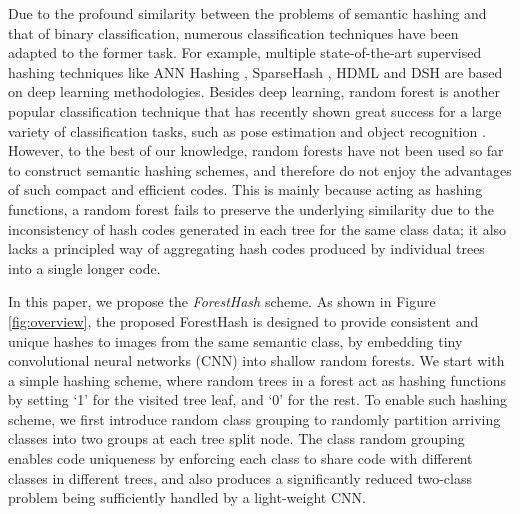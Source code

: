 \documentclass[runningheads]{llncs}
\begin{document}
Due to the profound similarity between the problems of semantic hashing and that
of binary classification, numerous classification techniques have been adapted
to the former task.  For example, multiple state-of-the-art supervised hashing
techniques like ANN Hashing \cite{MM-NN}, SparseHash \cite{sparsehash}, HDML
\cite{HDML} and DSH \cite{STH} are based on deep learning methodologies.
Besides deep learning, random forest \cite{RF2001, RFBook} is another popular
classification technique that has recently shown great success for a large
variety of classification tasks, such as pose estimation \cite{RF-pose} and
object recognition \cite{RF-obj}.  However, to the best of our knowledge, random
forests have not been used so far to construct semantic hashing schemes, and
therefore do not enjoy the advantages of such compact and efficient  codes.  This
is mainly because acting as hashing functions, a random forest fails to preserve
the underlying similarity due to the inconsistency of hash codes generated in
each tree for the same class data; it also lacks a principled way of aggregating
hash codes produced by individual trees into a single longer code.

In this paper, we propose the \emph{ForestHash} scheme.  As shown in Figure
\ref{fig:overview}, the proposed ForestHash is designed to provide consistent
and unique hashes to images from the same semantic class, by embedding tiny
convolutional neural networks (CNN) into shallow random forests.
  We start with a
simple hashing scheme, where random trees in a forest act as hashing functions
by setting `1' for the visited tree leaf, and `0' for the rest.  To enable such
hashing scheme, we first introduce random class grouping to randomly partition
arriving classes into two groups at each tree split node. The class random
grouping enables code uniqueness by enforcing each class to share code with
different classes in different trees, and also produces a significantly reduced
two-class problem being sufficiently handled by a light-weight CNN.
\end{document}
